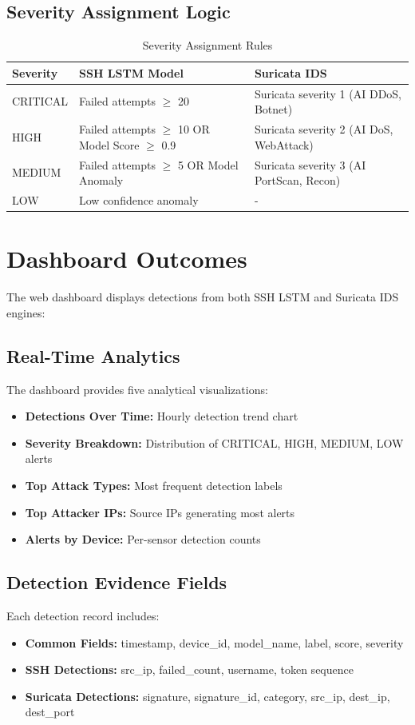 \documentclass[12pt,a4paper]{report} %
\begin{document}
\subsection{Severity Assignment Logic}
\begin{table}[H]
	\centering
	\caption{Severity Assignment Rules}
	\label{tab:severity-rules}
	\begin{tabular}{|l|l|l|}
		\hline
		\textbf{Severity} & \textbf{SSH LSTM Model} & \textbf{Suricata IDS} \\
		\hline
		CRITICAL & Failed attempts $\geq$ 20 & Suricata severity 1 (AI DDoS, Botnet) \\
		HIGH & Failed attempts $\geq$ 10 OR Model Score $\geq$ 0.9 & Suricata severity 2 (AI DoS, WebAttack) \\
		MEDIUM & Failed attempts $\geq$ 5 OR Model Anomaly & Suricata severity 3 (AI PortScan, Recon) \\
		LOW & Low confidence anomaly & - \\
		\hline
	\end{tabular}
\end{table}

\section{Dashboard Outcomes}
\label{sec:dashboard-outcomes}
The web dashboard displays detections from both SSH LSTM and Suricata IDS engines:

\subsection{Real-Time Analytics}
The dashboard provides five analytical visualizations:
\begin{itemize}
	\item \textbf{Detections Over Time:} Hourly detection trend chart
	\item \textbf{Severity Breakdown:} Distribution of CRITICAL, HIGH, MEDIUM, LOW alerts
	\item \textbf{Top Attack Types:} Most frequent detection labels
	\item \textbf{Top Attacker IPs:} Source IPs generating most alerts
	\item \textbf{Alerts by Device:} Per-sensor detection counts
\end{itemize}

\subsection{Detection Evidence Fields}
Each detection record includes:
\begin{itemize}
	\item \textbf{Common Fields:} timestamp, device\_id, model\_name, label, score, severity
	\item \textbf{SSH Detections:} src\_ip, failed\_count, username, token sequence
	\item \textbf{Suricata Detections:} signature, signature\_id, category, src\_ip, dest\_ip, dest\_port
\end{itemize}
\end{document}
